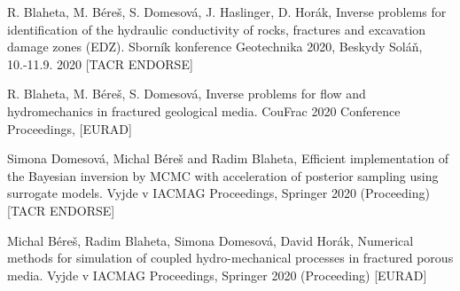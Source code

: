 \documentclass[a4paper]{article}
\begin{document}
\begin{thebibliography}{32}
	 R. Blaheta, M. Béreš, S. Domesová, J. Haslinger, D. Horák, Inverse problems for identification of the hydraulic conductivity of rocks, fractures and excavation damage zones (EDZ). Sborník konference Geotechnika 2020, Beskydy Soláň, 10.-11.9. 2020 [TACR ENDORSE]
	
	 R. Blaheta, M. Béreš, S. Domesová, Inverse problems for flow and hydromechanics
	in fractured geological media. CouFrac 2020 Conference Proceedings, [EURAD]
	
	 Simona Domesová, Michal Béreš and Radim Blaheta, Efficient implementation
	of the Bayesian inversion by MCMC with acceleration of posterior sampling using surrogate models. Vyjde v IACMAG Proceedings, Springer 2020 (Proceeding) [TACR ENDORSE]
	
	 Michal Béreš, Radim Blaheta, Simona Domesová, David Horák, Numerical methods for simulation of coupled hydro-mechanical processes in fractured porous media. Vyjde v IACMAG Proceedings, Springer 2020 (Proceeding) [EURAD]
\end{thebibliography}
\end{document}
